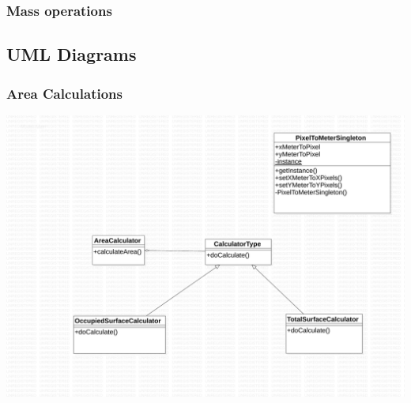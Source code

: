 \subsubsection{Mass operations}


\subsection{UML Diagrams}

\subsubsection{Area Calculations}

\includegraphics[width=\textwidth]{../uml/area}
